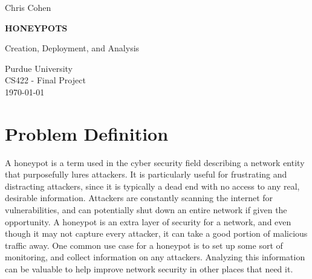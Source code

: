 \documentclass[12pt]{article}
\begin{document}

\begin{titlepage}
    \begin{center}
        \vspace*{1cm}
        \large
        Chris Cohen

        \vspace{6cm}
        \HUGE
        \textbf{HONEYPOTS}

        \Large
        Creation, Deployment, and Analysis\\

        \vfill

        \normalsize
        Purdue University\\
        CS422 - Final Project\\
        \today
            
    \end{center}
\end{titlepage}


\section{Problem Definition}
A honeypot is a term used in the cyber security field describing a network entity that purposefully lures attackers.
It is particularly useful for frustrating and distracting attackers, since it is typically a dead end with no access to any real, desirable information.
Attackers are constantly scanning the internet for vulnerabilities, and can potentially shut down an entire network if given the opportunity.
A honeypot is an extra layer of security for a network, and even though it may not capture every attacker, it can take a good portion of malicious traffic away.
One common use case for a honeypot is to set up some sort of monitoring, and collect information on any attackers.
Analyzing this information can be valuable to help improve network security in other places that need it.

\end{document}
